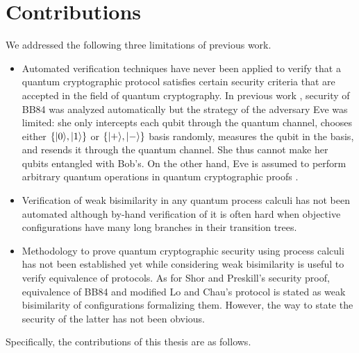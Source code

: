 \section{Contributions}
We addressed the following three limitations of previous work.
\begin{itemize}
 \item Automated verification techniques have never been applied to
       verify that a quantum cryptographic protocol satisfies
       certain security criteria that are accepted in the field of
       quantum cryptography.
       In previous work \cite{NagarajanPapanikolaouBowenGay2005},
       security of BB84 was analyzed
       automatically but the strategy of the adversary Eve was
       limited: she only intercepts each qubit through the
       quantum channel, chooses either $\{|0\rangle,|1\rangle\}$ or 
       $\{|+\rangle,|-\rangle\}$ basis randomly,
       measures the qubit in the basis, and resends it through the
       quantum channel. She thus cannot make her qubits entangled with
       Bob's.
       On the other hand, Eve is assumed to perform arbitrary
       quantum operations in quantum cryptographic proofs
       \cite{Mayers1998, ShorPreskill2000}.
 \item Verification of weak bisimilarity in 
       any quantum process calculi
       has not been automated although by-hand verification of it
       is often hard when objective configurations have
       many long branches in their transition trees.
 \item Methodology to prove quantum cryptographic security using
       process calculi has not been established yet
       while considering weak bisimilarity is useful to verify
       equivalence of protocols. As for
       Shor and Preskill's security proof, equivalence of
       BB84 and modified Lo and Chau's protocol is stated as
       weak bisimilarity of configurations formalizing them.
       However, the way to state the security of
       the latter has not been obvious.
\end{itemize}
Specifically, the contributions of this thesis are as follows.
